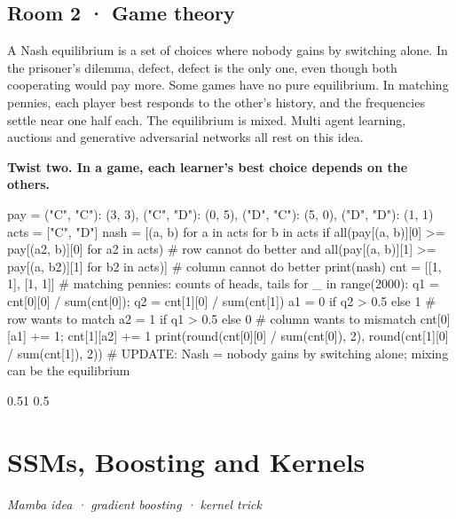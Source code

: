 \documentclass[11pt,a4paper]{report}
\begin{document}
\section*{Room 2 · Game theory}
A Nash equilibrium is a set of choices where nobody gains by switching alone. In the prisoner's dilemma, defect, defect is the only one, even though both cooperating would pay more. Some games have no pure equilibrium. In matching pennies, each player best responds to the other's history, and the frequencies settle near one half each. The equilibrium is mixed. Multi agent learning, auctions and generative adversarial networks all rest on this idea.
\begin{tcolorbox}[colback=yellow!12,colframe=orange!70!black,boxrule=0.4pt,left=4pt,right=4pt,top=2pt,bottom=2pt]\textbf{Twist two. In a game, each learner's best choice depends on the others.}\end{tcolorbox}
\begin{Code}
pay = {("C", "C"): (3, 3), ("C", "D"): (0, 5), ("D", "C"): (5, 0), ("D", "D"): (1, 1)}
acts = ["C", "D"]
nash = [(a, b) for a in acts for b in acts
        if all(pay[(a, b)][0] >= pay[(a2, b)][0] for a2 in acts)    # row cannot do better
        and all(pay[(a, b)][1] >= pay[(a, b2)][1] for b2 in acts)]  # column cannot do better
print(nash)
cnt = [[1, 1], [1, 1]]                      # matching pennies: counts of heads, tails
for _ in range(2000):
    q1 = cnt[0][0] / sum(cnt[0]); q2 = cnt[1][0] / sum(cnt[1])
    a1 = 0 if q2 > 0.5 else 1               # row wants to match
    a2 = 1 if q1 > 0.5 else 0               # column wants to mismatch
    cnt[0][a1] += 1; cnt[1][a2] += 1
print(round(cnt[0][0] / sum(cnt[0]), 2), round(cnt[1][0] / sum(cnt[1]), 2))
# UPDATE: Nash = nobody gains by switching alone; mixing can be the equilibrium
\end{Code}
\begin{Out}
[('D', 'D')]
0.51 0.5
\end{Out}
\chapter{SSMs, Boosting and Kernels}
\textit{Mamba idea · gradient boosting · kernel trick}
\end{document}
